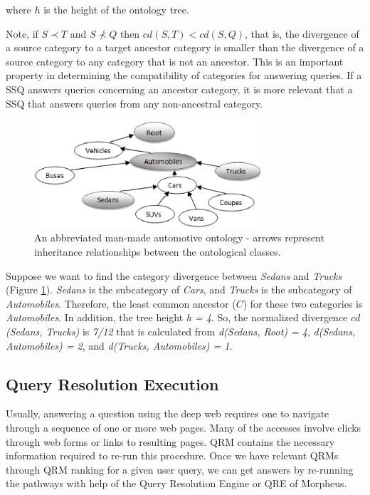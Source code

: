 \noindent where $h$ is the height of the ontology tree.

Note, if $S \prec T$ and $S \not\prec Q$ then $cd(S,T) <
cd(S,Q)$, that is, the divergence of a source category to a target
ancestor category is smaller than the divergence of a source category to any
category that is not an ancestor. This is an important property in
determining the compatibility of categories for answering queries.  If a
SSQ answers queries concerning an ancestor category, it is more relevant
that a SSQ that answers queries from any non-ancestral category.

\begin{figure}[t]
\centering
\includegraphics[width=85mm]{img/automotive_ontology.eps}
\caption{An abbreviated man-made automotive ontology - arrows represent inheritance relationships between the ontological classes.}
\label{fig:automotive_ontology}
\end{figure}

Suppose we want to find the category divergence between \textit{Sedans}
and \textit{Trucks} (Figure \ref{fig:automotive_ontology}). 
\textit{Sedans} is the subcategory of \textit{Cars}, and \textit{Trucks}
is the subcategory of \textit{Automobiles}. Therefore, the least common ancestor ($C$)
for these two categories is \textit{Automobiles}. In addition, the tree height \textit{h = 4}.
So, the normalized divergence $cd$\textit{(Sedans, Trucks)} is \textit{7/12}
that is calculated from \textit{d(Sedans, Root) = 4}, \textit{d(Sedans, Automobiles) = 2}, and \textit{d(Trucks, Automobiles) = 1}.


\subsection{Query Resolution Execution} 

Usually, answering a question using the 
deep web requires one to navigate through a sequence of one or 
more web pages. Many of the accesses involve clicks through 
web forms or links to resulting pages. QRM contains the necessary  
information required to re-run this procedure. Once we have 
relevant QRMs through QRM ranking for a given user query, we can  
get answers by re-running the pathways with help of 
the Query Resolution Engine or QRE of Morpheus. 


  


